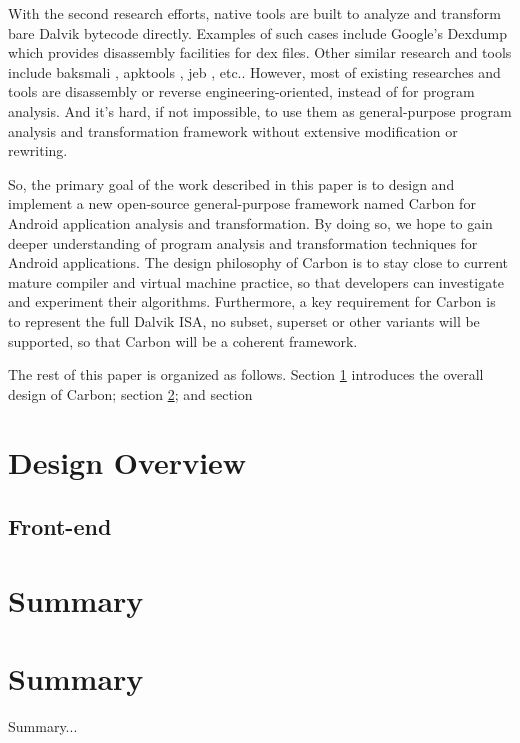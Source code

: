\documentclass[preprint, cm]{sigplanconf}
\begin{document}
With the second research efforts, native tools are built to
analyze and transform bare Dalvik bytecode directly. Examples of
such cases include Google's
Dexdump which provides disassembly facilities for dex files. Other
similar research and tools 
include baksmali \cite{}, apktools \cite{}, jeb \cite{}, etc.. However, most of
existing researches and tools are disassembly or reverse engineering-oriented, 
instead of for program analysis. And it's hard, if not
impossible, to use them as general-purpose
program analysis and transformation framework without extensive
modification or rewriting.

So, the primary goal of the work described in this paper is to design
and implement a new open-source general-purpose framework named
Carbon for
Android application analysis and transformation. By doing so, we
hope to gain deeper understanding of program analysis and
transformation techniques
for Android applications. The design philosophy
of Carbon is to stay close to current mature compiler and virtual
machine practice, so that developers can investigate and experiment
their algorithms. Furthermore, a key requirement for Carbon is to
represent the full Dalvik ISA, no subset, superset or other
variants will be supported, so that Carbon will be a coherent
framework. 




The rest of this paper is organized as follows. Section \ref{sec-design}
introduces the overall design of Carbon; section \ref{}; and section
\

\section{Design Overview}\label{sec-design}

\subsection{Front-end}

\section{Summary}


\section{Summary}\label{sec-summary}

Summary...

\acks
\end{document}
